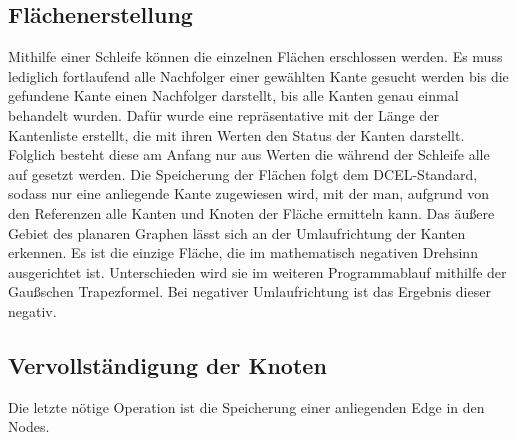 \subsection{Flächenerstellung}
Mithilfe einer Schleife können die einzelnen Flächen erschlossen werden.
Es muss lediglich fortlaufend alle Nachfolger einer gewählten Kante gesucht werden bis die gefundene Kante einen Nachfolger darstellt, bis alle Kanten genau einmal behandelt wurden.
Dafür wurde eine repräsentative  mit der Länge der Kantenliste erstellt, die mit ihren Werten den Status der Kanten darstellt.
Folglich besteht diese am Anfang nur aus  Werten die während der Schleife alle auf  gesetzt werden.
Die Speicherung der Flächen folgt dem DCEL-Standard, sodass nur eine anliegende Kante zugewiesen wird, mit der man, aufgrund von den Referenzen alle Kanten und Knoten der Fläche ermitteln kann.
Das äußere Gebiet des planaren Graphen lässt sich an der Umlaufrichtung der Kanten erkennen.
Es ist die einzige Fläche, die im mathematisch negativen Drehsinn ausgerichtet ist.
Unterschieden wird sie im weiteren Programmablauf mithilfe der Gaußschen Trapezformel.
Bei negativer Umlaufrichtung ist das Ergebnis dieser negativ.\\

\subsection{Vervollständigung der Knoten}
Die letzte nötige Operation ist die Speicherung einer anliegenden Edge in den Nodes.\\
